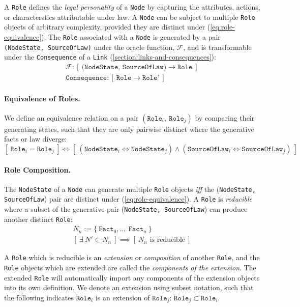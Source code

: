 \documentclass{article}
\numberwithin{equation}{section}
\begin{document}
A \texttt{Role} defines the \textit{legal personality} of a \texttt{Node} by capturing the attributes, actions, or characterstics attributable under law. A \texttt{Node} can be subject to multiple \texttt{Role} objects of arbitrary complexity, provided they are distinct under (\ref{eq:role-equivalence}). The \texttt{Role} associated with a \texttt{Node} is generated by a pair \texttt{(NodeState, SourceOfLaw)} under the oracle function, $\mathcal{F}$, and is transformable under the \texttt{Consequence} of a \texttt{Link} (\ref{section:links-and-consequences}): 
\begin{align}	
	\mathcal{F} : [ \ \texttt{(NodeState, SourceOfLaw)} \rightarrow \texttt{Role} \ ] \\
	\texttt{Consequence} : [ \ \texttt{Role} \rightarrow \texttt{Role'} \ ]
\end{align}

\paragraph{Equivalence of Roles.} We define an equivalence relation on a pair $(\texttt{Role}_i, \ \texttt{Role}_j)$ by comparing their generating states, such that they are only pairwise distinct where the generative facts or law diverge:  
\begin{equation}\label{eq:role-equivalence}
[ \ \texttt{Role}_i = \texttt{Role}_j \ ] \iff [ \ (\texttt{NodeState}_i \iff \texttt{NodeState}_j) \land (\texttt{SourceOfLaw}_i \iff \texttt{SourceOfLaw}_j) \ ]
\end{equation}

\paragraph{Role Composition.} The \texttt{NodeState} of a \texttt{Node} can generate multiple \texttt{Role} objects \textit{iff} the (\texttt{NodeState, SourceOfLaw}) pair are distinct under (\ref{eq:role-equivalence}). A \texttt{Role} is \textit{reducible} where a subset of the generative pair (\texttt{NodeState, SourceOfLaw}) can produce another distinct \texttt{Role}:
\begin{align}
	N_n := \{ \ \texttt{Fact}_0, .., \ \texttt{Fact}_n \ \} \\
	[ \ \exists \ N' \subset N_n \ ] \implies [ \ \text{$N_n$ is reducible} \ ] 
\end{align}

A \texttt{Role} which is reducible is an \textit{extension} or \textit{composition} of another \texttt{Role}, and the \texttt{Role} objects which are extended are called the \textit{components of the extension}. The extended \texttt{Role} will automatically import any components of the extension objects into its own definition. We denote an extension using subset notation, such that the following indicates $\texttt{Role}_i$ is an extension of $\texttt{Role}_j$: $\texttt{Role}_j \subset \texttt{Role}_i$.
\end{document}
